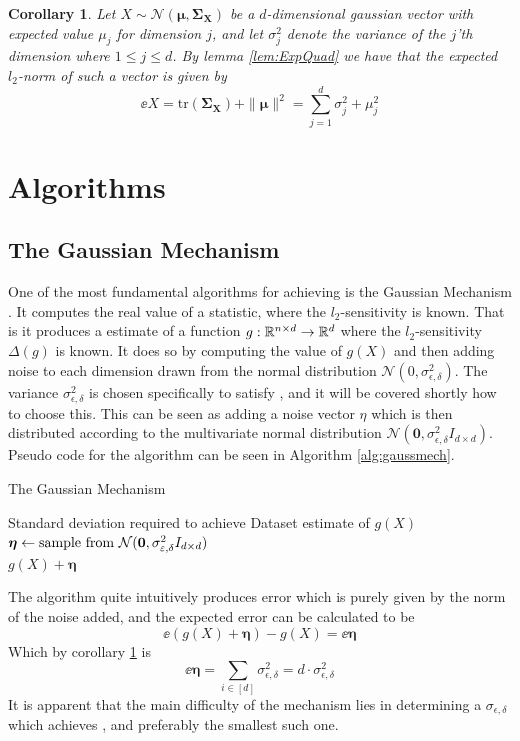 \documentclass[a4paper,12pt]{article}
\newcommand{\Desc}[2]{\State \makebox[6em][l]{#1}#2}
\newtheorem{corollary}{Corollary}[section]
\begin{document}
\begin{corollary}
\label{cor:expNorm}
Let $X \sim \mathcal{N}(\bm{\mu}, \bm{\Sigma_X})$ be a $d$-dimensional gaussian vector
with expected value $\mu_j$ for dimension $j$, and let $\sigma_j^2$ denote the variance of the 
$j$'th dimension where $1 \le j \le d$.
By lemma \ref{lem:ExpQuad} we have that the expected $l_2$-norm 
of such a vector is given by
\[
    \ee{X} = \text{tr} (\bm{\Sigma_X}) + \|\bm{\mu}\|^2 = \sum_{j=1}^d \sigma_j^2 + \mu_j^2
\]
\end{corollary}


\section{Algorithms}
\subsection{The Gaussian Mechanism}
One of the most fundamental algorithms for achieving 
\edp is the Gaussian Mechanism \cite{dpbasic}. It computes the real
value of a statistic, where the $l_2$-sensitivity is known.
That is it produces a \edp estimate of a function 
$g: \mathbb{R}^{n \times d} \rightarrow \mathbb{R}^{d}$ where the $l_2$-sensitivity $ \Delta(g) $ 
is known.
It does so by computing the value of $g(X)$ and then adding noise
to each dimension drawn from the normal distribution 
$\mathcal{N}(0, \sigma_{\epsilon,\delta}^2)$.
The variance $\sigma_{\epsilon, \delta}^2$ is chosen specifically to satisfy \edp, 
and it will be covered shortly how to choose this.
This can be seen as adding a noise vector $\eta$ which 
is then distributed according to
the multivariate normal distribution 
$\mathcal{N}(\bm{0}, \sigma_{\epsilon,\delta}^2I_{d \times d})$. 
Pseudo code for the algorithm can be seen in Algorithm \ref{alg:gaussmech}.

\begin{algorithm}
\caption{The Gaussian Mechanism}\label{alg:gaussmech}
\begin{algorithmic}
    \Input
    \Desc{$\sigma_{\epsilon,\delta}$}{Standard deviation required to achieve \edp}
    \Desc{$X \in \R^{n \times d}$}{Dataset}
    \EndInput
    \Output
    \State\edp estimate of $g(X)$
    \EndOutput
    \State$\bm{\eta} \gets \textnormal{sample from } \mathcal{N}(\bm{0}, \sigma_{\varepsilon,\delta}^2I_{d \times d})$ \\
    \Return$g(X) + \bm{\eta}$
\end{algorithmic}
\end{algorithm}
\noindent The algorithm quite intuitively produces error which is purely given by the norm of the noise added, and the expected error can be calculated to be
\[
    \ee{(g(X) + \bm{\eta}) - g(X)} = 
    \ee{\bm{\eta}}
\]
Which by corollary \ref{cor:expNorm} is 
\begin{equation}
\label{eq:ExpErrGM}
    \ee{\bm{\eta}} = \sum_{i \in [d]} \sigma_{\epsilon,\delta}^2 = d \cdot \sigma_{\epsilon,\delta}^2
\end{equation}
It is apparent that the main difficulty of the mechanism 
lies in determining a $\sigma_{\epsilon, \delta}$ which achieves
\edp, and preferably the smallest such one.
\end{document}
